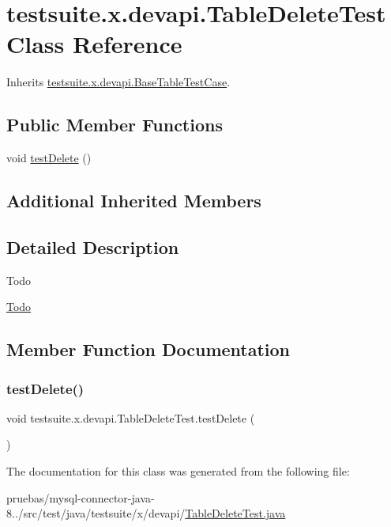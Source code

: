 \hypertarget{classtestsuite_1_1x_1_1devapi_1_1_table_delete_test}{}\section{testsuite.\+x.\+devapi.\+Table\+Delete\+Test Class Reference}
\label{classtestsuite_1_1x_1_1devapi_1_1_table_delete_test}


Inherits \mbox{\hyperlink{classtestsuite_1_1x_1_1devapi_1_1_base_table_test_case}{testsuite.\+x.\+devapi.\+Base\+Table\+Test\+Case}}.

\subsection*{Public Member Functions}
\begin{DoxyCompactItemize}
\item 
void \mbox{\hyperlink{classtestsuite_1_1x_1_1devapi_1_1_table_delete_test_a04e57892fb3ea103eb701ea946eb5a14}{test\+Delete}} ()
\end{DoxyCompactItemize}
\subsection*{Additional Inherited Members}


\subsection{Detailed Description}
\begin{DoxyRefDesc}{Todo}
\item[\mbox{\hyperlink{todo__todo000008}{Todo}}]\end{DoxyRefDesc}


\subsection{Member Function Documentation}
\mbox{\label{classtestsuite_1_1x_1_1devapi_1_1_table_delete_test_a04e57892fb3ea103eb701ea946eb5a14}} 
\subsubsection{\texorpdfstring{test\+Delete()}{testDelete()}}
{\footnotesize\ttfamily void testsuite.\+x.\+devapi.\+Table\+Delete\+Test.\+test\+Delete (\begin{DoxyParamCaption}{ }\end{DoxyParamCaption})}



The documentation for this class was generated from the following file\+:\begin{DoxyCompactItemize}
\item 
pruebas/mysql-\/connector-\/java-\/8../src/test/java/testsuite/x/devapi/\mbox{\hyperlink{_table_delete_test_8java}{Table\+Delete\+Test.\+java}}\end{DoxyCompactItemize}
